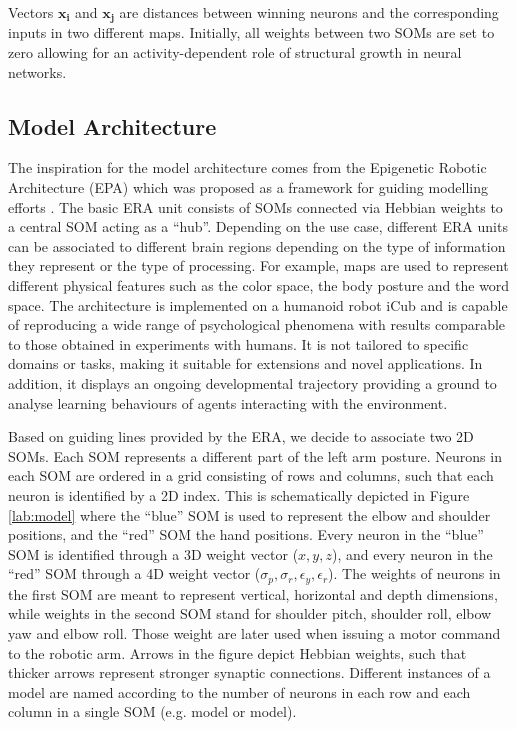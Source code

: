 Vectors $\mathbf{x_i}$ and $\mathbf{x_j}$ are distances between winning neurons and the corresponding inputs in two different maps.
Initially, all weights between two SOMs are set to zero allowing for an activity-dependent role of structural growth in neural networks.


\subsection{Model Architecture}

The inspiration for the model architecture comes from the Epigenetic Robotic 
Architecture (EPA) which was proposed as a framework for guiding modelling 
efforts \citep{Morse2010}. The basic ERA unit consists of SOMs connected via 
Hebbian weights to a central SOM acting as a ``hub''. Depending on the use case, 
different ERA units can be associated to different brain regions depending on 
the type of information they represent or the type of processing. For example, 
maps are used to represent different physical features such as the color space, 
the body posture and the word space. The architecture is implemented on a 
humanoid robot iCub and is capable of reproducing a wide range of psychological 
phenomena with results comparable to those obtained in experiments with humans. 
It is not tailored to specific domains or tasks, making it suitable for 
extensions and novel applications. In addition, it displays an ongoing 
developmental trajectory providing a ground to analyse learning behaviours of 
agents 
interacting with the environment.

Based on guiding lines provided by the ERA, we decide to associate two 2D SOMs.
Each SOM represents a different part of the left arm posture. Neurons in each SOM are ordered in a grid consisting of rows and columns, such that each neuron is identified by a 2D index. This is schematically depicted in Figure \ref{lab:model} where the ``blue'' SOM is used to represent the elbow and shoulder positions, and the ``red'' SOM the hand positions. Every neuron in the ``blue'' SOM is identified through a 3D weight vector ($x, y, z$), and every neuron in the ``red'' SOM through a 4D weight vector ($\sigma_p, \sigma_r, \epsilon_y, \epsilon_r$). The weights of neurons in the first SOM are meant to represent vertical, horizontal and depth dimensions, while weights in the second SOM stand for shoulder pitch, shoulder roll, elbow yaw and elbow roll. Those weight are later used when issuing a motor command to the robotic arm.
Arrows in the figure depict Hebbian weights, such that thicker arrows represent stronger synaptic connections. Different instances of a model are named according to the number of neurons in each row and each column in a single SOM (e.g. \ssom model or \bsom model). 

